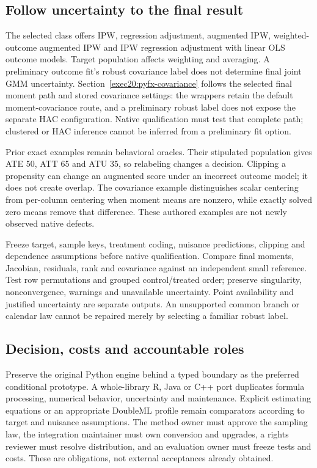 \subsection{Follow uncertainty to the final result}
The selected class offers IPW, regression adjustment, augmented IPW, weighted-outcome augmented IPW and IPW regression adjustment with linear OLS outcome models. Target population affects weighting and averaging. A preliminary outcome fit's robust covariance label does not determine final joint GMM uncertainty. Section~\ref{exec20:pyfx-covariance} follows the selected final moment path and stored covariance settings: the wrappers retain the default moment-covariance route, and a preliminary robust label does not expose the separate HAC configuration. Native qualification must test that complete path; clustered or HAC inference cannot be inferred from a preliminary fit option.~\citep{exec20_python_effect_source}

Prior exact examples remain behavioral oracles. Their stipulated population gives ATE 50, ATT 65 and ATU 35, so relabeling changes a decision. Clipping a propensity can change an augmented score under an incorrect outcome model; it does not create overlap. The covariance example distinguishes scalar centering from per-column centering when moment means are nonzero, while exactly solved zero means remove that difference. These authored examples are not newly observed native defects.~\citep{exec20_python_effect_reference}

Freeze target, sample keys, treatment coding, nuisance predictions, clipping and dependence assumptions before native qualification. Compare final moments, Jacobian, residuals, rank and covariance against an independent small reference. Test row permutations and grouped control/treated order; preserve singularity, nonconvergence, warnings and unavailable uncertainty. Point availability and justified uncertainty are separate outputs. An unsupported common branch or calendar law cannot be repaired merely by selecting a familiar robust label.~\citep{exec20_python_effect_source,exec20_python_effect_reference}

\subsection{Decision, costs and accountable roles}
Preserve the original Python engine behind a typed boundary as the preferred conditional prototype. A whole-library R, Java or C++ port duplicates formula processing, numerical behavior, uncertainty and maintenance. Explicit estimating equations or an appropriate DoubleML profile remain comparators according to target and nuisance assumptions. The method owner must approve the sampling law, the integration maintainer must own conversion and upgrades, a rights reviewer must resolve distribution, and an evaluation owner must freeze tests and costs. These are obligations, not external acceptances already obtained.~\citep{exec20_python_effect_source,exec24_statsmodels_distribution}

